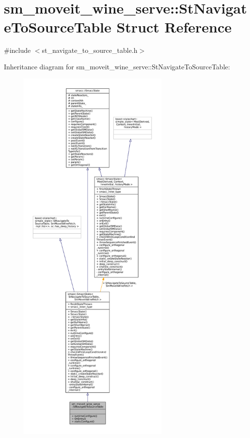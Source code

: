 \hypertarget{structsm__moveit__wine__serve_1_1StNavigateToSourceTable}{}\section{sm\+\_\+moveit\+\_\+wine\+\_\+serve\+:\+:St\+Navigate\+To\+Source\+Table Struct Reference}
\label{structsm__moveit__wine__serve_1_1StNavigateToSourceTable}


{\ttfamily \#include $<$st\+\_\+navigate\+\_\+to\+\_\+source\+\_\+table.\+h$>$}



Inheritance diagram for sm\+\_\+moveit\+\_\+wine\+\_\+serve\+:\+:St\+Navigate\+To\+Source\+Table\+:
\nopagebreak
\begin{figure}[H]
\begin{center}
\leavevmode
\includegraphics[height=550pt]{structsm__moveit__wine__serve_1_1StNavigateToSourceTable__inherit__graph}
\end{center}
\end{figure}


